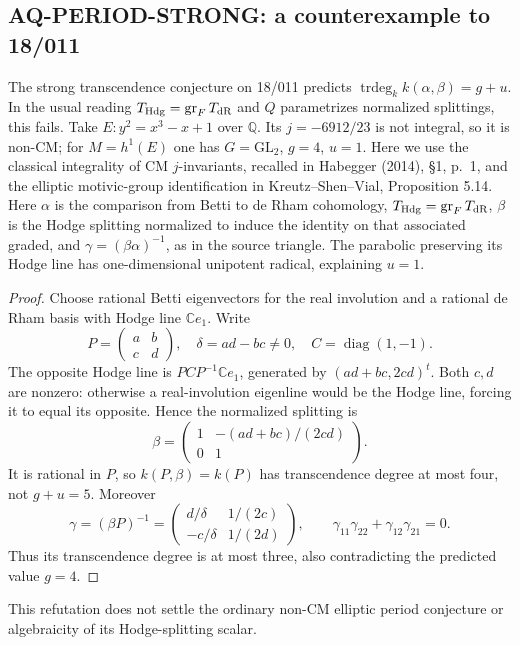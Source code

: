 \documentclass[11pt,a4paper]{article}
\theoremstyle{definition}\newtheorem{definition}[theorem]{Definition}
\theoremstyle{remark}\newtheorem{remark}[theorem]{Remark}
\begin{document}
\subsection{AQ-PERIOD-STRONG: a counterexample to 18/011}
The strong transcendence conjecture on 18/011 predicts
$\operatorname{trdeg}_k k(\alpha,\beta)=g+u$.
In the usual reading $T_{\rm Hdg}=\operatorname{gr}_F T_{\rm dR}$
and $Q$ parametrizes normalized splittings, this fails.
Take $E:y^2=x^3-x+1$ over $\mathbb Q$.
Its $j=-6912/23$ is not integral, so it is non-CM;
for $M=h^1(E)$ one has $G=\mathrm{GL}_2$, $g=4$, $u=1$.
Here we use the classical integrality of CM
$j$-invariants, recalled in Habegger (2014),
\S1, p.~1, and the elliptic motivic-group
identification in Kreutz--Shen--Vial,
Proposition 5.14.
Here $\alpha$ is the comparison from Betti to de Rham
cohomology, $T_{\rm Hdg}=\operatorname{gr}_F T_{\rm dR}$,
$\beta$ is the Hodge splitting normalized to induce the
identity on that associated graded, and
$\gamma=(\beta\alpha)^{-1}$, as in the source triangle.
The parabolic preserving its Hodge line has
one-dimensional unipotent radical, explaining $u=1$.
\begin{proof}
Choose rational Betti eigenvectors for the real involution
and a rational de Rham basis with Hodge line $\mathbb Ce_1$.
Write
\[
 P=\begin{pmatrix}a&b\\c&d\end{pmatrix},\quad
 \delta=ad-bc\ne0,\quad C=\operatorname{diag}(1,-1).
\]
The opposite Hodge line is $PCP^{-1}\mathbb Ce_1$,
generated by $(ad+bc,2cd)^t$. Both $c,d$ are nonzero:
otherwise a real-involution eigenline would be the
Hodge line, forcing it to equal its opposite.
Hence the normalized splitting is
\[
 \beta=\begin{pmatrix}1&-(ad+bc)/(2cd)\\0&1\end{pmatrix}.
\]
It is rational in $P$, so $k(P,\beta)=k(P)$ has
transcendence degree at most four, not $g+u=5$.
Moreover
\[
 \gamma=(\beta P)^{-1}
 =\begin{pmatrix}d/\delta&1/(2c)\\-c/\delta&1/(2d)\end{pmatrix},
 \qquad \gamma_{11}\gamma_{22}+\gamma_{12}\gamma_{21}=0.
\]
Thus its transcendence degree is at most three,
also contradicting the predicted value $g=4$.
\end{proof}
This refutation does not settle the ordinary non-CM
elliptic period conjecture or algebraicity of its
Hodge-splitting scalar.
\end{document}
